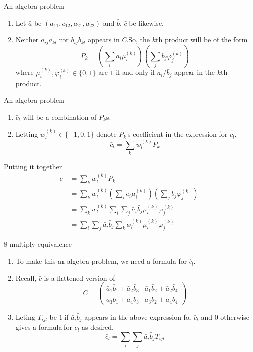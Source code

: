 \documentclass{beamer}
\begin{document}
\begin{frame}{An algebra problem}
    \begin{enumerate}
        \item Let $\bar{a}$ be $(a_{11},a_{12},a_{21},a_{22})$ and $\bar{b}$, $\bar{c}$ be likewise.\pause
        \item Neither $a_{ij} a_{kl}$ nor $b_{ij} b_{kl}$ appears in $C$.\pause So, the $k$th product will be of the form \[
        P_k = (\sum_i \bar{a}_i\mu^{(k)}_i)(\sum_j \bar{b}_j\varphi^{(k)}_j)
        \]
        where $\mu^{(k)}_i,\varphi^{(k)}_i\in\{0,1\}$ are $1$ if and only if $\bar{a}_i$/$\bar{b}_j$ appear in the $k$th product.
    \end{enumerate}
\end{frame}
\begin{frame}{An algebra problem}
    \begin{enumerate}
        \item $\bar{c}_l$ will be a combination of $P_k$s.\pause
        \item Letting $w_l^{(k)}\in\{-1,0,1\}$ denote $P_k$'s coefficient in the expression for $\bar{c}_l$, \[
        \bar{c}_l = \sum_kw_l^{(k)}P_k
        \]
    \end{enumerate}
\end{frame}
\begin{frame}{Putting it together}
\[
    \begin{aligned}
        \bar{c}_l &= \sum_kw_l^{(k)}P_k \\
        &= \sum_kw_l^{(k)}(\sum_i \bar{a}_i\mu^{(k)}_i)(\sum_j \bar{b}_j\varphi^{(k)}_j) \\
        &= \sum_kw_l^{(k)}\sum_i\sum_j\bar{a}_i\bar{b}_j\mu^{(k)}_i\varphi^{(k)}_j \\
        &= \sum_i\sum_j\bar{a}_i\bar{b}_j\sum_kw_l^{(k)}\mu^{(k)}_i\varphi^{(k)}_j
    \end{aligned}
\]
\end{frame}
\begin{frame}{8 multiply equivalence}
\begin{enumerate}
    \item To make this an algebra problem, we need a formula for $\bar{c}_l$.
    \item \pause Recall, $\bar{c}$ is a flattened version of
    \[
    C = \begin{pmatrix}
    \bar{a}_1\bar{b}_1+\bar{a}_2\bar{b}_3 & \bar{a}_1\bar{b}_2+\bar{a}_2\bar{b}_4 \\
    \bar{a}_3\bar{b}_1+\bar{a}_4\bar{b}_3 & \bar{a}_3\bar{b}_2+\bar{a}_4\bar{b}_4
    \end{pmatrix}
    \]
    \item \pause Leting $T_{ijl}$ be $1$ if $\bar{a}_i\bar{b}_j$ appears in the above expression for $\bar{c}_l$ and $0$ otherwise gives a formula for $\bar{c}_l$ as desired. \[
    \bar{c}_l = \sum_i\sum_j\bar{a}_i\bar{b}_jT_{ijl}
    \]
\end{enumerate}
\end{frame}
\end{document}
